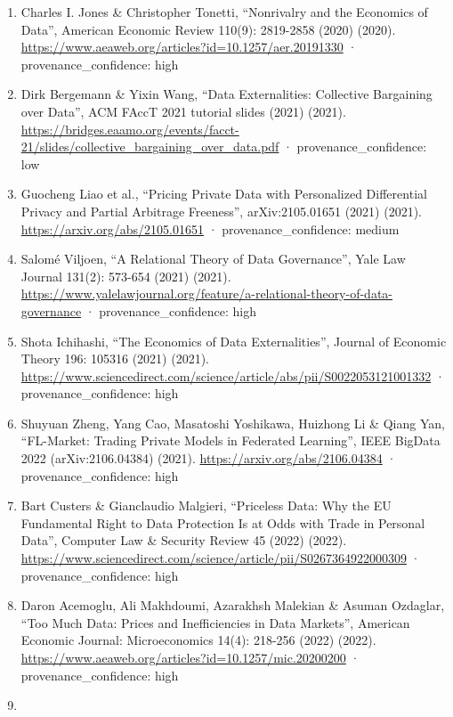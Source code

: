 \documentclass[
  11pt,
]{article}
\begin{document}
\begin{enumerate}
  \url{https://www.penguin.co.uk/books/442343/privacy-is-power-by-carissa-veliz/9780552177719}
  · provenance\_confidence: high
\item
  Charles I. Jones \& Christopher Tonetti, ``Nonrivalry and the
  Economics of Data'', American Economic Review 110(9): 2819-2858 (2020)
  (2020). \url{https://www.aeaweb.org/articles?id=10.1257/aer.20191330}
  · provenance\_confidence: high
\item
  Dirk Bergemann \& Yixin Wang, ``Data Externalities: Collective
  Bargaining over Data'', ACM FAccT 2021 tutorial slides (2021) (2021).
  \url{https://bridges.eaamo.org/events/facct-21/slides/collective_bargaining_over_data.pdf}
  · provenance\_confidence: low
\item
  Guocheng Liao et al., ``Pricing Private Data with Personalized
  Differential Privacy and Partial Arbitrage Freeness'',
  arXiv:2105.01651 (2021) (2021). \url{https://arxiv.org/abs/2105.01651}
  · provenance\_confidence: medium
\item
  Salomé Viljoen, ``A Relational Theory of Data Governance'', Yale Law
  Journal 131(2): 573-654 (2021) (2021).
  \url{https://www.yalelawjournal.org/feature/a-relational-theory-of-data-governance}
  · provenance\_confidence: high
\item
  Shota Ichihashi, ``The Economics of Data Externalities'', Journal of
  Economic Theory 196: 105316 (2021) (2021).
  \url{https://www.sciencedirect.com/science/article/abs/pii/S0022053121001332}
  · provenance\_confidence: high
\item
  Shuyuan Zheng, Yang Cao, Masatoshi Yoshikawa, Huizhong Li \& Qiang
  Yan, ``FL-Market: Trading Private Models in Federated Learning'', IEEE
  BigData 2022 (arXiv:2106.04384) (2021).
  \url{https://arxiv.org/abs/2106.04384} · provenance\_confidence: high
\item
  Bart Custers \& Gianclaudio Malgieri, ``Priceless Data: Why the EU
  Fundamental Right to Data Protection Is at Odds with Trade in Personal
  Data'', Computer Law \& Security Review 45 (2022) (2022).
  \url{https://www.sciencedirect.com/science/article/pii/S0267364922000309}
  · provenance\_confidence: high
\item
  Daron Acemoglu, Ali Makhdoumi, Azarakhsh Malekian \& Asuman Ozdaglar,
  ``Too Much Data: Prices and Inefficiencies in Data Markets'', American
  Economic Journal: Microeconomics 14(4): 218-256 (2022) (2022).
  \url{https://www.aeaweb.org/articles?id=10.1257/mic.20200200} ·
  provenance\_confidence: high
\item

\end{enumerate}
\end{document}
